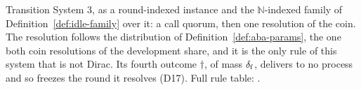 \begin{definition}
  \label{def:aba-wcc-spec}
  \leanok
  Transition System 3, as a round-indexed instance and the $\mathbb{N}$-indexed family of Definition~\ref{def:idle-family} over it: a call quorum, then one resolution of the coin.
  The resolution follows the distribution of Definition~\ref{def:aba-params}, the one both coin resolutions of the development share, and it is the only rule of this system that is not Dirac.
  Its fourth outcome $\dagger$, of mass $\delta_{\mathrm{f}}$, delivers to no process and so freezes the round it resolves (D17).
  Full rule table: .
\end{definition}
